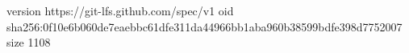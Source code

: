 version https://git-lfs.github.com/spec/v1
oid sha256:0f10e6b060de7eaebbc61dfe311da44966bb1aba960b38599bdfe398d7752007
size 1108
